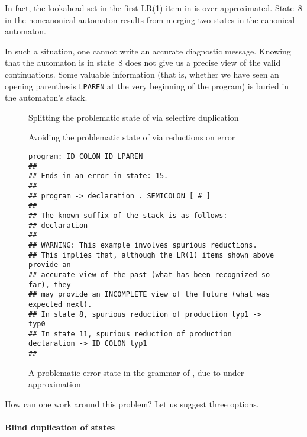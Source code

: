 \documentclass[onecolumn,11pt,nocopyrightspace,preprint]{sigplanconf}
\begin{document}
In fact, the lookahead set in the first LR(1) item
in  is over-approximated.
State~8 in the noncanonical automaton results from merging two states
in the canonical automaton.

In such a situation, one cannot write an accurate diagnostic message.
Knowing that the automaton is in state~8 does not give us a
precise view of the valid continuations. Some valuable information (that is,
whether we have seen an opening parenthesis \verb+LPAREN+ at the very
beginning of the program) is buried in the automaton's stack.

\begin{figure}

\caption{Splitting the problematic state of  via selective duplication}
\label{fig:declarations:phantom}
\end{figure}

\begin{figure}

\caption{Avoiding the problematic state of  via reductions on error}
\label{fig:declarations:onerrorreduce}
\end{figure}

\begin{figure}
\begin{verbatim}
program: ID COLON ID LPAREN
##
## Ends in an error in state: 15.
##
## program -> declaration . SEMICOLON [ # ]
##
## The known suffix of the stack is as follows:
## declaration
##
## WARNING: This example involves spurious reductions.
## This implies that, although the LR(1) items shown above provide an
## accurate view of the past (what has been recognized so far), they
## may provide an INCOMPLETE view of the future (what was expected next).
## In state 8, spurious reduction of production typ1 -> typ0
## In state 11, spurious reduction of production declaration -> ID COLON typ1
##
\end{verbatim}
\caption{A problematic error state in the grammar of , due to under-approximation}
\label{fig:declarations:under}
\end{figure}

How can one work around this problem? Let us suggest three options.

\paragraph{Blind duplication of states}
\end{document}
